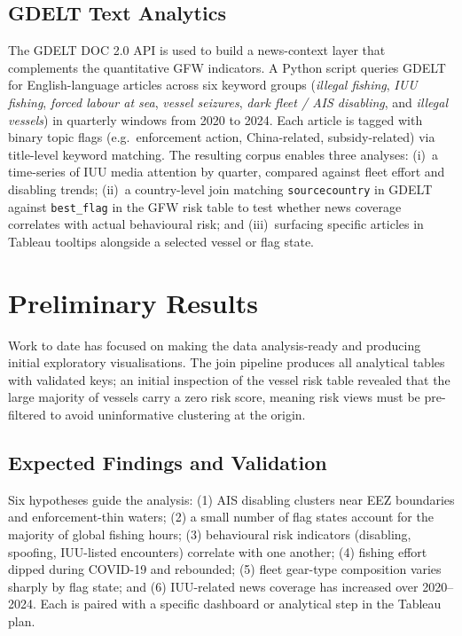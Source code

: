 \documentclass[sigconf]{acmart}
\begin{document}
\subsection{GDELT Text Analytics}
The GDELT DOC 2.0 API \cite{GDELT} is used to build a news-context layer that complements the quantitative GFW indicators. A Python script queries GDELT for English-language articles across six keyword groups (\emph{illegal fishing}, \emph{IUU fishing}, \emph{forced labour at sea}, \emph{vessel seizures}, \emph{dark fleet / AIS disabling}, and \emph{illegal vessels}) in quarterly windows from 2020 to 2024. Each article is tagged with binary topic flags (e.g.\ enforcement action, China-related, subsidy-related) via title-level keyword matching. The resulting corpus enables three analyses: (i)~a time-series of IUU media attention by quarter, compared against fleet effort and disabling trends; (ii)~a country-level join matching \texttt{sourcecountry} in GDELT against \texttt{best\_flag} in the GFW risk table to test whether news coverage correlates with actual behavioural risk; and (iii)~surfacing specific articles in Tableau tooltips alongside a selected vessel or flag state.

\section{Preliminary Results}
Work to date has focused on making the data analysis-ready and producing initial exploratory visualisations. The join pipeline produces all analytical tables with validated keys; an initial inspection of the vessel risk table revealed that the large majority of vessels carry a zero risk score, meaning risk views must be pre-filtered to avoid uninformative clustering at the origin.

\subsection{Expected Findings and Validation}
Six hypotheses guide the analysis: (1) AIS disabling clusters near EEZ boundaries and enforcement-thin waters; (2) a small number of flag states account for the majority of global fishing hours; (3) behavioural risk indicators (disabling, spoofing, IUU-listed encounters) correlate with one another; (4) fishing effort dipped during COVID-19 and rebounded; (5) fleet gear-type composition varies sharply by flag state; and (6) IUU-related news coverage has increased over 2020--2024. Each is paired with a specific dashboard or analytical step in the Tableau plan.
\end{document}
